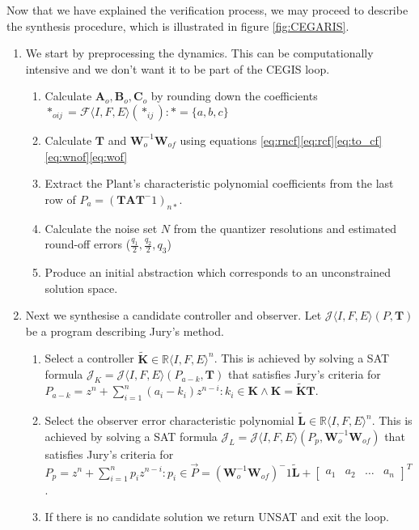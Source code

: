 \documentclass[runningheads,a4paper]{llncs}
\newcommand{\mat}[1]{\boldsymbol{#1}}
\begin{document}
Now that we have explained the verification process, we may proceed to describe the synthesis procedure, which is illustrated in figure \ref{fig:CEGARIS}.
\begin{enumerate}
\item We start by preprocessing the dynamics. This can be computationally intensive and we don't want it to be part of the CEGIS loop.
\begin{enumerate}
\item Calculate $\mat{A}_o,\mat{B}_o,\mat{C}_o$ by rounding down the coefficients $*_{oij}=\mathcal{F}\langle I,F,E\rangle (*_{ij}) : *=\{a,b,c\}$
\item Calculate $\mat{T}$ and $\mat{W}_o^{-1}\mat{W}_{of}$ using equations \eqref{eq:rncf}\eqref{eq:rcf}\eqref{eq:to_cf}\eqref{eq:wnof}\eqref{eq:wof}
\item Extract the Plant's characteristic polynomial coefficients from the last row of $P_a=(\mat{T}\mat{A}\mat{T}^-1)_{n*}$.
\item Calculate the noise set $N$ from the quantizer resolutions and estimated round-off errors ($\frac{q_1}{2},\frac{q_2}{2},q_3$)
\item Produce an initial abstraction which corresponds to an unconstrained solution space.
\end{enumerate}
\item Next we synthesise a candidate controller and observer. Let $\mathcal{J}\langle I,F,E \rangle (P,\mat{T})$ be a program describing Jury's method.
\begin{enumerate}
\item Select a controller $\tilde{\mat{K}} \in \mathbb{R}\langle I,F,E\rangle^n$. This is achieved by solving a SAT formula $\mathcal{J}_K=\mathcal{J}\langle I,F,E \rangle (P_{a-k},\mat{T})$ that satisfies Jury's criteria for $P_{a-k}=z^n+\sum_{i=1}^n (a_i-k_i) z^{n-i} : k_i \in \mat{K} \wedge \mat{K}=\tilde{\mat{K}}\mat{T}$.
\item Select the observer error characteristic polynomial $\tilde{\mat{L}} \in \mathbb{R}\langle I,F,E\rangle^n$. 
This is achieved by solving a SAT formula $\mathcal{J}_L=\mathcal{J}\langle I,F,E \rangle (P_p,\mat{W}_o^{-1}\mat{W}_{of})$ 
that satisfies Jury's criteria for 
$P_p=z^n+\sum_{i=1}^n p_i z^{n-i} : p_i \in \vec{P}= (\mat{W}_o^{-1}\mat{W}_{of})^-1 \tilde{\mat{L}} 
+ [\begin{array}{cccc}a_1&a_2&\hdots&a_n\end{array}]^T$.
\item If there is no candidate solution we return UNSAT and exit the loop.

\end{enumerate}
\end{enumerate}
\end{document}
